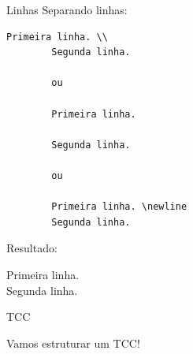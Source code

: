 \documentclass{beamer}
\begin{document}
\begin{frame}[fragile]{Linhas}
    Separando linhas:
    \begin{lstlisting}[style=limpo]
        Primeira linha. \\
        Segunda linha.

        ou

        Primeira linha.

        Segunda linha.

        ou

        Primeira linha. \newline
        Segunda linha.
    \end{lstlisting}

    Resultado:
    \begin{center}
        Primeira linha. \\
        Segunda linha.
    \end{center}
\end{frame}

\begin{frame}{TCC}
    \begin{center}
        Vamos estruturar um TCC!
    \end{center}
\end{frame}
\end{document}
